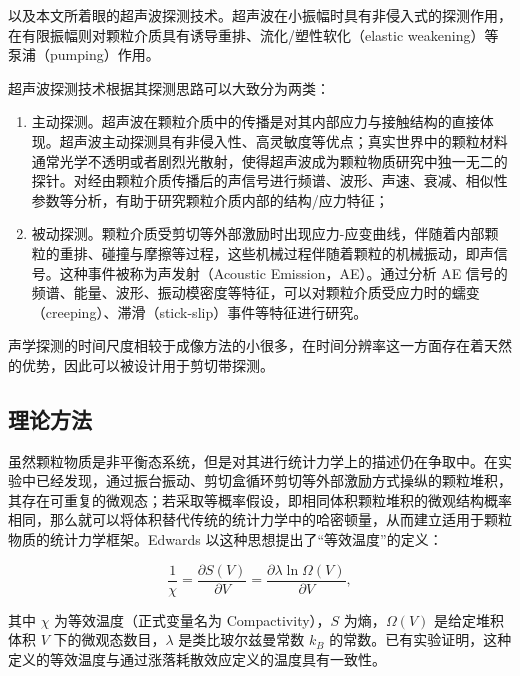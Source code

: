 以及本文所着眼的超声波探测技术。超声波在小振幅时具有非侵入式的探测作用，在有限振幅则对颗粒介质具有诱导重排\cite{PhysRevE.84.020301}、流化/塑性软化（elastic weakening）\cite{PhysRevE.84.020301}等泵浦（pumping）作用。

超声波探测技术根据其探测思路可以大致分为两类：

\begin{enumerate}
  \item 主动探测。超声波在颗粒介质中的传播是对其内部应力与接触结构的直接体现\cite{PhysRevB.48.15646,Jia1999UltrasoundPI,Transitional}。超声波主动探测具有非侵入性、高灵敏度等优点；真实世界中的颗粒材料通常光学不透明或者剧烈光散射，使得超声波成为颗粒物质研究中独一无二的探针。对经由颗粒介质传播后的声信号进行频谱、波形、声速、衰减、相似性参数等分析，有助于研究颗粒介质内部的结构/应力特征；
  \item 被动探测。颗粒介质受剪切等外部激励时出现应力-应变曲线，伴随着内部颗粒的重排、碰撞与摩擦等过程，这些机械过程伴随着颗粒的机械振动，即声信号。这种事件被称为声发射（Acoustic Emission，AE）。通过分析 AE 信号的频谱、能量、波形、振动模密度等特征\cite{PhysRevLett.120.218003,10.1029/2023JB026612,doi:10.1073/pnas.2305134120}，可以对颗粒介质受应力时的蠕变（creeping）、滞滑（stick-slip）事件等特征进行研究。
\end{enumerate}

声学探测的时间尺度相较于成像方法的小很多，在时间分辨率这一方面存在着天然的优势，因此可以被设计用于剪切带探测\cite{PhysRevE.85.051302}。


\subsection{理论方法}

虽然颗粒物质是非平衡态系统，但是对其进行统计力学上的描述仍在争取中。在实验中已经发现，通过振台振动、剪切盒循环剪切等外部激励方式操纵的颗粒堆积，其存在可重复的微观态；若采取等概率假设，即相同体积颗粒堆积的微观结构概率相同，那么就可以将体积替代传统的统计力学中的哈密顿量，从而建立适用于颗粒物质的统计力学框架。Edwards 以这种思想提出了“等效温度”的定义\cite{EDWARDS19891080}：


\begin{equation}
  \frac{1}{\chi} = \frac{\partial S(V)}{\partial V} = \frac{\partial \lambda\ln{\Omega(V)}}{\partial V},
\end{equation}

其中 $\chi$ 为等效温度（正式变量名为 Compactivity），$S$ 为熵，$\Omega(V)$ 是给定堆积体积 $V$ 下的微观态数目，$\lambda$ 是类比玻尔兹曼常数 $k_{B}$ 的常数。已有实验证明，这种定义的等效温度与通过涨落耗散效应定义的温度具有一致性\cite{PhysRevLett.129.228004}。

